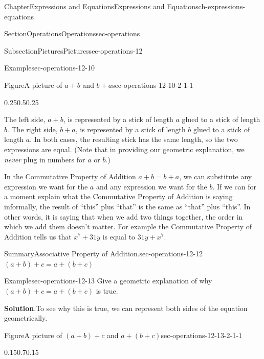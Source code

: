 \documentclass[twoside,11pt,]{book}
\newcommand{\blocktitlefont}{\relax}
\numberwithin{equation}{chapter}
\begin{document}
\begin{chapterptx}{Chapter}{Expressions and Equations}{}{Expressions and Equations}{}{}{ch-expressions-equations}
\begin{sectionptx}{Section}{Operations}{}{Operations}{}{}{sec-operations}
\begin{subsectionptx}{Subsection}{Pictures}{}{Pictures}{}{}{sec-operations-12}
\begin{example}{Example}{}{sec-operations-12-10}
\begin{figureptx}{Figure}{A picture of \(a+b\) and \(b+a\)}{sec-operations-12-10-2-1-1}{}
\begin{image}{0.25}{0.5}{0.25}{}
{%
}%
\end{image}%
\tcblower
\end{figureptx}%
 The left side, \(a+b\), is represented by a stick of length \(a\) glued to a stick of length \(b\). The right side, \(b+a\), is represented by a stick of length \(b\) glued to a stick of length \(a\). In both cases, the resulting stick has the same length, so the two expressions are equal. (Note that in providing our geometric explanation, we \emph{never} plug in numbers for \(a\) or \(b\).)%
\end{example}
In the Commutative Property of Addition \(a+b = b+a\), we can substitute any expression we want for the \(a\) and any expression we want for the \(b\). If we can for a moment explain what the Commutative Property of Addition is saying informally, the result of ``this'' plus ``that'' is the same as ``that'' plus ``this''. In other words, it is saying that when we add two things together, the order in which we add them doesn't matter. For example the Commutative Property of Addition tells us that \(x^7 + 31y\) is equal to \(31y + x^7\).%
\begin{assemblage}{Summary}{Associative Property of Addition.}{sec-operations-12-12}%
\((a+b)+c = a+(b+c)\)%
\end{assemblage}
\begin{example}{Example}{}{sec-operations-12-13}%
Give a geometric explanation of why \((a+b)+c = a+(b+c)\) is true.%
\par\smallskip%
\noindent\textbf{\blocktitlefont Solution}.\hypertarget{sec-operations-12-13-2}{}\quad{}To see why this is true, we can represent both sides of the equation geometrically. \begin{figureptx}{Figure}{A picture of \((a+b)+c\) and \(a+(b+c)\)}{sec-operations-12-13-2-1-1}{}%
\begin{image}{0.15}{0.7}{0.15}{}%
\end{image}
\end{figureptx}
\end{example}
\end{subsectionptx}
\end{sectionptx}
\end{chapterptx}
\end{document}
